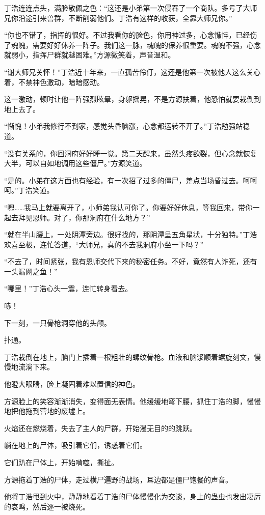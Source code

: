 \begin{this_body}
丁浩连连点头，满脸敬佩之色：“这还是小弟第一次侵吞了一个商队。多亏了大师兄你沿途引来兽群，不断削弱他们。丁浩有这样的收获，全靠大师兄你。”

“你也不错了，指挥的很好。不过我看你的脸色，你用神过多，心念憔悴，已经伤了魂魄，需要好好休养一阵子。我们这一脉，魂魄的保养很重要。魂魄不强，心念就弱小，指挥尸群就越困难。”方源微笑着，声音温和。

“谢大师兄关怀！”丁浩近十年来，一直孤苦伶仃，这还是他第一次被他人这么关心着，不禁神色激动，暗暗感动。

这一激动，顿时让他一阵强烈眩晕，身躯摇晃，不是方源扶着，他恐怕就要栽倒到地上去了。

“惭愧！小弟我修行不到家，感觉头昏脑涨，心念都运转不开了。”丁浩勉强站稳道。

“没有关系的，你回洞府好好睡一觉。第二天醒来，虽然头疼欲裂，但心念就恢复大半，可以自如地调用这些僵尸。”方源笑道。

“是的。小弟在这方面也有经验，有一次招了过多的僵尸，差点当场昏过去。呵呵呵。”丁浩笑道。

“嗯……我马上就要离开了，小师弟我认可你了。你要好好休息，等我回来，带你一起去拜见恩师。对了，你那洞府在什么地方？”

“就在半山腰上，一处阴潭旁边。很好找的，那阴潭呈五角星状，十分独特。”丁浩欢喜至极，连忙答道，“大师兄，真的不去我洞府小坐一下吗？”

“不去了，时间紧张，我有恩师交代下来的秘密任务。不好，竟然有人诈死，还有一头漏网之鱼！”

“哪里！”丁浩心头一震，连忙转身看去。

哧！

下一刻，一只骨枪洞穿他的头颅。

扑通。

丁浩栽倒在地上，脑门上插着一根粗壮的螺纹骨枪。血液和脑浆顺着螺旋刻文，慢慢地流淌下来。

他瞪大眼睛，脸上凝固着难以置信的神色。

方源脸上的笑容渐渐消失，变得面无表情。他缓缓地弯下腰，抓住丁浩的脚，慢慢地把他拖到营地的废墟上。

火焰还在燃烧着，失去了主人的尸群，开始漫无目的的跳跃。

躺在地上的尸体，吸引着它们，诱惑着它们。

它们趴在尸体上，开始啃噬，撕扯。

方源拖着丁浩的尸体，走过横尸遍野的战场，耳边都是僵尸饱餐的声音。

他将丁浩甩到火中，静静地看着丁浩的尸体慢慢化为交谈，身上的蛊虫也发出凄厉的哀鸣，然后逐一被烧死。


\end{this_body}

